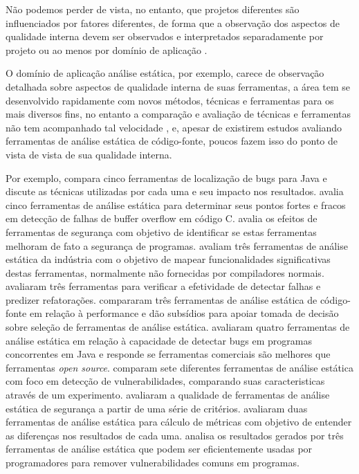 Não podemos perder de vista, no entanto, que projetos diferentes são
influenciados por fatores diferentes, de forma que a observação dos aspectos
de qualidade interna devem ser observados e interpretados separadamente por
projeto \cite{Terceiro2012Understanding} ou ao menos por domínio de
aplicação \cite{Meirelles2013}.

O domínio de aplicação análise estática, por exemplo, carece de observação
detalhada sobre aspectos de qualidade interna de suas ferramentas, a
área tem se desenvolvido rapidamente com novos métodos, técnicas e ferramentas
para os mais diversos fins, no entanto a comparação e avaliação de técnicas e ferramentas
não tem acompanhado tal velocidade \cite{Li2010}, e, apesar de existirem
estudos avaliando ferramentas de análise estática de código-fonte, poucos
fazem isso do ponto de vista de vista de sua qualidade interna.

Por exemplo,  compara cinco ferramentas de localização
de bugs para Java e discute as técnicas utilizadas por cada uma e seu impacto
nos resultados.  avalia cinco ferramentas de
análise estática para determinar seus pontos fortes e fracos em detecção de
falhas de buffer overflow em código C.  avalia os efeitos
de ferramentas de segurança com objetivo de identificar se estas ferramentas
melhoram de fato a segurança de programas. 
avaliam três ferramentas de análise estática da indústria com o objetivo de
mapear funcionalidades significativas destas ferramentas, normalmente não
fornecidas por compiladores normais.  avaliaram três
ferramentas para verificar a efetividade de detectar falhas e predizer
refatorações.  compararam três ferramentas de análise
estática de código-fonte em relação à performance e dão subsídios para apoiar
tomada de decisão sobre seleção de ferramentas de análise estática.
 avaliaram quatro ferramentas de análise estática em
relação à capacidade de detectar bugs em programas concorrentes em Java e
responde se ferramentas comerciais são melhores que ferramentas {\it open
source}.  comparam sete diferentes ferramentas de análise
estática com foco em detecção de vulnerabilidades, comparando suas
caracteristicas através de um experimento.  avaliaram a
qualidade de ferramentas de análise estática de segurança a partir de uma
série de critérios.  avaliaram duas ferramentas de
análise estática para cálculo de métricas com objetivo de entender as
diferenças nos resultados de cada uma.  analisa os
resultados gerados por três ferramentas de análise estática que podem ser
eficientemente usadas por programadores para remover vulnerabilidades comuns
em programas.


